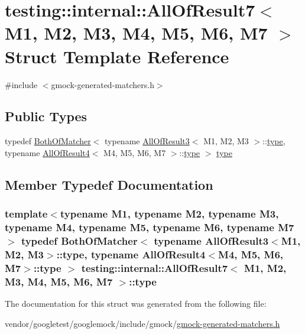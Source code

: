 \hypertarget{structtesting_1_1internal_1_1AllOfResult7}{}\section{testing\+:\+:internal\+:\+:All\+Of\+Result7$<$ M1, M2, M3, M4, M5, M6, M7 $>$ Struct Template Reference}
\label{structtesting_1_1internal_1_1AllOfResult7}


{\ttfamily \#include $<$gmock-\/generated-\/matchers.\+h$>$}

\subsection*{Public Types}
\begin{DoxyCompactItemize}
\item 
typedef \hyperlink{classtesting_1_1internal_1_1BothOfMatcher}{Both\+Of\+Matcher}$<$ typename \hyperlink{structtesting_1_1internal_1_1AllOfResult3}{All\+Of\+Result3}$<$ M1, M2, M3 $>$\+::\hyperlink{structtesting_1_1internal_1_1AllOfResult7_a47ab0d670258434b0e65530591948e8c}{type}, typename \hyperlink{structtesting_1_1internal_1_1AllOfResult4}{All\+Of\+Result4}$<$ M4, M5, M6, M7 $>$\+::\hyperlink{structtesting_1_1internal_1_1AllOfResult7_a47ab0d670258434b0e65530591948e8c}{type} $>$ \hyperlink{structtesting_1_1internal_1_1AllOfResult7_a47ab0d670258434b0e65530591948e8c}{type}
\end{DoxyCompactItemize}


\subsection{Member Typedef Documentation}
\subsubsection[{\texorpdfstring{type}{type}}]{\setlength{\rightskip}{0pt plus 5cm}template$<$typename M1, typename M2, typename M3, typename M4, typename M5, typename M6, typename M7$>$ typedef {\bf Both\+Of\+Matcher}$<$ typename {\bf All\+Of\+Result3}$<$M1, M2, M3$>$\+::{\bf type}, typename {\bf All\+Of\+Result4}$<$M4, M5, M6, M7$>$\+::{\bf type} $>$ {\bf testing\+::internal\+::\+All\+Of\+Result7}$<$ M1, M2, M3, M4, M5, M6, M7 $>$\+::{\bf type}}\hypertarget{structtesting_1_1internal_1_1AllOfResult7_a47ab0d670258434b0e65530591948e8c}{}\label{structtesting_1_1internal_1_1AllOfResult7_a47ab0d670258434b0e65530591948e8c}


The documentation for this struct was generated from the following file\+:\begin{DoxyCompactItemize}
\item 
vendor/googletest/googlemock/include/gmock/\hyperlink{gmock-generated-matchers_8h}{gmock-\/generated-\/matchers.\+h}\end{DoxyCompactItemize}

